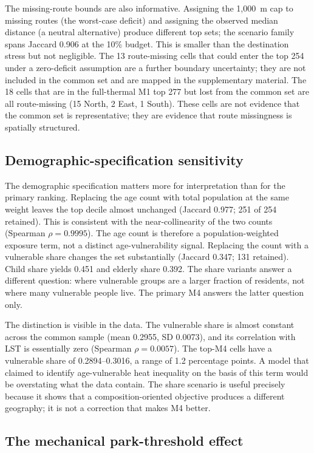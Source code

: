 \documentclass[times,twoside]{_Templates/MultiTargetManuscript}
\begin{document}
The missing-route bounds are also informative. Assigning the 1,000~m cap to
missing routes (the worst-case deficit) and assigning the observed median
distance (a neutral alternative) produce different top sets; the scenario family
spans Jaccard 0.906 at the 10\% budget. This is smaller than the destination
stress but not negligible. The 13 route-missing cells that could enter the top
254 under a zero-deficit assumption are a further boundary uncertainty; they are
not included in the common set and are mapped in the supplementary material.
The 18 cells that are in the full-thermal M1 top 277 but lost from the common set
are all route-missing (15 North, 2 East, 1 South). These cells are not evidence
that the common set is representative; they are evidence that route missingness
is spatially structured.

\subsection{Demographic-specification sensitivity}

The demographic specification matters more for interpretation than for the
primary ranking. Replacing the age count with total population at the same weight
leaves the top decile almost unchanged (Jaccard 0.977; 251 of 254 retained). This
is consistent with the near-collinearity of the two counts (Spearman
$\rho=0.9995$). The age count is therefore a population-weighted exposure term,
not a distinct age-vulnerability signal. Replacing the count with a vulnerable
share changes the set substantially (Jaccard 0.347; 131 retained). Child share
yields 0.451 and elderly share 0.392. The share variants answer a different
question: where vulnerable groups are a larger fraction of residents, not where
many vulnerable people live. The primary M4 answers the latter question only.

The distinction is visible in the data. The vulnerable share is almost constant
across the common sample (mean 0.2955, SD 0.0073), and its correlation with LST
is essentially zero (Spearman $\rho=0.0057$). The top-M4 cells have a vulnerable
share of 0.2894--0.3016, a range of 1.2 percentage points. A model that claimed to
identify age-vulnerable heat inequality on the basis of this term would be
overstating what the data contain. The share scenario is useful precisely because
it shows that a composition-oriented objective produces a different geography;
it is not a correction that makes M4 better.

\subsection{The mechanical park-threshold effect}
\end{document}
